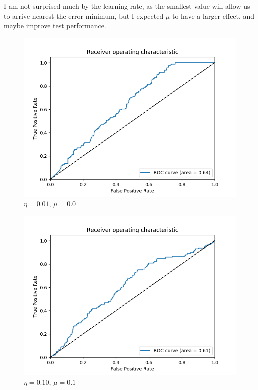 \documentclass[12pt]{article}
\begin{document}
I am not surprised much by the learning rate, as the smallest value will allow
us to arrive nearest the error minimum, but I expected $\mu$ to have a larger
effect, and maybe improve test performance.

\begin{figure}[!h]
\centering
\includegraphics[width=12cm]{roc_01_00}
\caption{$\eta = 0.01$, $\mu=0.0$}
\end{figure}

\begin{figure}[!h]
\centering
\includegraphics[width=12cm]{roc_10_10}
\caption{$\eta = 0.10$, $\mu=0.1$}
\end{figure}
\end{document}
